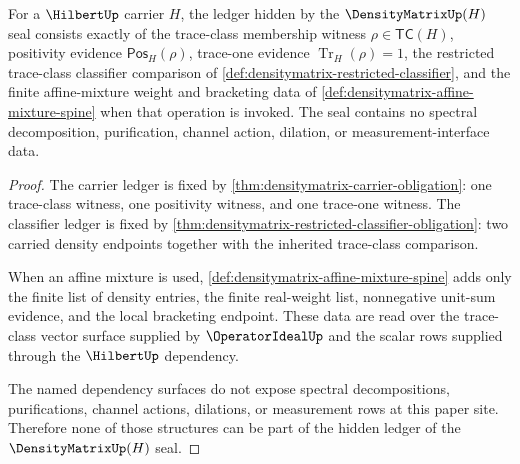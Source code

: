 \begin{theorem}
\label{thm:densitymatrix-positivity-trace-ledger-obligation}
For a $\HilbertUp$ carrier $H$, the ledger hidden by the $\DensityMatrixUp(H)$ seal consists exactly of the trace-class membership witness $\rho\in\mathsf{TC}(H)$, positivity evidence $\mathsf{Pos}_H(\rho)$, trace-one evidence $\operatorname{Tr}_H(\rho)=1$, the restricted trace-class classifier comparison of \autoref{def:densitymatrix-restricted-classifier}, and the finite affine-mixture weight and bracketing data of \autoref{def:densitymatrix-affine-mixture-spine} when that operation is invoked. The seal contains no spectral decomposition, purification, channel action, dilation, or measurement-interface data.
\end{theorem}
\begin{proof}
The carrier ledger is fixed by \autoref{thm:densitymatrix-carrier-obligation}: one trace-class witness, one positivity witness, and one trace-one witness. The classifier ledger is fixed by \autoref{thm:densitymatrix-restricted-classifier-obligation}: two carried density endpoints together with the inherited trace-class comparison.

When an affine mixture is used, \autoref{def:densitymatrix-affine-mixture-spine} adds only the finite list of density entries, the finite real-weight list, nonnegative unit-sum evidence, and the local bracketing endpoint. These data are read over the trace-class vector surface supplied by $\OperatorIdealUp$ and the scalar rows supplied through the $\HilbertUp$ dependency.

The named dependency surfaces do not expose spectral decompositions, purifications, channel actions, dilations, or measurement rows at this paper site. Therefore none of those structures can be part of the hidden ledger of the $\DensityMatrixUp(H)$ seal.
\end{proof}


